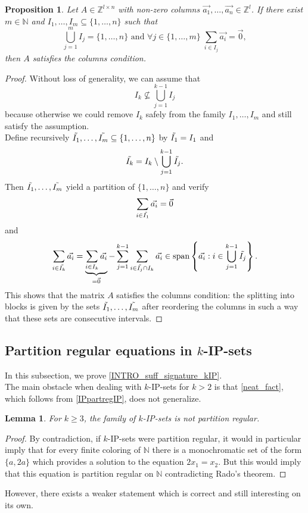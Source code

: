 \documentclass{article}
\theoremstyle{definition}
\theoremstyle{plain}
\newtheorem{proposition}[theorem]{Proposition}
\newtheorem{lemma}[theorem]{Lemma}
\theoremstyle{remark}
\newcommand{\N}{\ensuremath{\mathbb{N}}}
\newcommand{\Z}{\ensuremath{\mathbb{Z}}}
\begin{document}
\begin{proposition}
    Let $A \in \Z^{l\times n}$ with non-zero columns $\Vec{a_1}, \ldots, \Vec{a_n} \in \Z^l$. If there exist $m\in \N$ and $I_1, \ldots, I_m \subseteq \{1,\ldots,n\}$ such that 
        $$\bigcup_{j=1}^m I_j = \{1,\ldots,n\} \text{ and } \forall j \in \{1,\ldots,m\} \; \sum_{i \in I_j} \Vec{a_i} = \Vec{0},$$
    then $A$ satisfies the columns condition.
\end{proposition}
\begin{proof}
    Without loss of generality, we can assume that 
    $$I_k \nsubseteq \bigcup_{j=1}^{k-1} I_j$$
    because otherwise we could remove $I_k$ safely from the family $I_1,\ldots, I_m$ and still satisfy the assumption.\\

    Define recursively $\Tilde{I_1}, \ldots, \Tilde{I_m} \subseteq \{1,\ldots,n\}$ by $\Tilde{I_1} = I_1$ and
    $$\Tilde{I_k} = I_k \setminus \bigcup_{j=1}^{k-1} \Tilde{I_j}.$$
    Then $\Tilde{I_1}, \ldots, \Tilde{I_m}$ yield a partition of $\{1,\ldots,n\}$ and verify
    $$\sum_{i\in \Tilde{I_1}} \Vec{a_i} = \Vec{0}$$
    and
    $$\sum_{i\in \Tilde{I_k}} \Vec{a_i} = \underbrace{\sum_{i\in {I_k}} \Vec{a_i}}_{=\Vec{0}} - \sum_{j=1}^{k-1}\sum_{i\in \Tilde{I_j} \cap I_k} \Vec{a_i} \in \mathrm{span}\left\{ \Vec{a_i} : i \in \bigcup_{j=1}^{k-1} \Tilde{I_j}\right\}.$$
    This shows that the matrix $A$ satisfies the columns condition: the splitting into blocks is given by the sets $\Tilde{I_1}, \ldots, \Tilde{I_m}$ after reordering the columns in such a way that these sets are consecutive intervals.
\end{proof}

\subsection{Partition regular equations in \texorpdfstring{$k$}{k}-IP-sets}\label{subsectionKIP}
In this subsection, we prove \cref{INTRO_suff_signature_kIP}.\\

The main obstacle when dealing with $k$-IP-sets for $k>2$ is that \cref{neat_fact}, which follows from \cref{IPpartregIP}, does not generalize.

\begin{lemma}
    For $k\geq 3$, the family of $k$-IP-sets is not partition regular.
\end{lemma}
    \begin{proof}
        By contradiction, if $k$-IP-sets were partition regular, it would in particular imply that for every finite coloring of $\N$ there is a monochromatic set of the form $\{a, 2a\}$ which provides a solution to the equation $2x_1 = x_2$. But this would imply that this equation is partition regular on $\N$ contradicting Rado's theorem.  
    \end{proof}
However, there exists a weaker statement which is correct and still interesting on its own.
\end{document}
